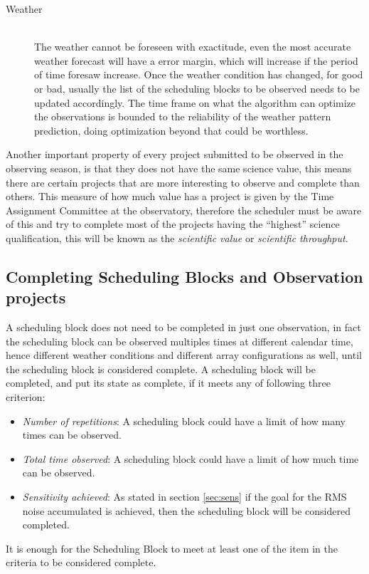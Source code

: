 \begin{description}
	\item[Weather] \hfill \\
The weather cannot be foreseen with exactitude, even the most accurate weather forecast will have a error margin, which will increase if the period of time foresaw increase. Once the weather condition has changed, for good or bad, usually the list of the scheduling blocks to be observed needs to be updated accordingly. The time frame on what the algorithm can optimize the observations is bounded to the reliability of the weather pattern prediction, doing optimization beyond that could be worthless.

\end{description}

Another important property of every project submitted to be observed in the observing season, is that they does not have the same science value, this means there are certain projects that are more interesting to observe and complete than others. This measure of how much value has a project is given by the Time Assignment Committee at the observatory, therefore the scheduler must be aware of this and try to complete most of the projects having the ``highest'' science qualification, this will be known as the \textit{scientific value} or \textit{scientific throughput}.

\subsection{Completing Scheduling Blocks and Observation projects}
\label{subsec:completing-obs}
A scheduling block does not need to be completed in just one observation, in fact the scheduling block can be observed multiples times at different calendar time, hence different weather conditions and different array configurations as well, until the scheduling block is considered complete.
A scheduling block will be completed, and put its state as complete, if it meets any of following three criterion:
\begin{itemize}
	\item \textit{Number of repetitions}: A scheduling block could have a limit of how many times can be observed.
	\item \textit{Total time observed}: A scheduling block could have a limit of how much time can be observed.
	\item \textit{Sensitivity achieved}: As stated in section \ref{sec:sens} if the goal for the RMS noise accumulated is achieved, then the scheduling block will be considered completed.
\end{itemize} 
It is enough for the Scheduling Block to meet at least one of the item in the criteria to be considered complete.

